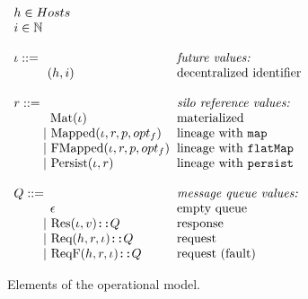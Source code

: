 \documentclass{article}
\theoremstyle{definition}
\newcommand{\gap}{\quad\quad}
\newcommand{\ba}{\begin{array}}
\newcommand{\ea}{\end{array}}
\begin{document}
\begin{figure}[ht!]
\centering

$\ba[t]{l@{\hspace{2mm}}l}
h \in Hosts                                         & \\   
i \in \mathbb{N}                                    & \\   
                                                    & \\   
\iota  ::=                                          & \mbox{{\it{future values:}}} \\
\gap \:\:\: (h, i)                                  & \mbox{decentralized identifier} \\   
                                                    & \\   
r ::=                                               & \mbox{{\it{silo reference values:}}} \\
\gap \:\:\:\: \text{Mat}(\iota)                     & \mbox{materialized} \\    
\gap ~|~  \text{Mapped}(\iota, r, p, opt_f)         & \mbox{lineage with \texttt{map}} \\    
\gap ~|~  \text{FMapped}(\iota, r, p, opt_f)        & \mbox{lineage with \texttt{flatMap}} \\   
\gap ~|~  \text{Persist}(\iota, r)                  & \mbox{lineage with \texttt{persist}} \\
                                                    & \\   
Q      ::=                                          & \mbox{{\it{message queue values:}}} \\
\gap \:\:\:\: \epsilon                              & \mbox{empty queue} \\
\gap ~|~    \text{Res}(\iota, v) \texttt{::} Q      & \mbox{response} \\
\gap ~|~    \text{Req}(h, r, \iota) \texttt{::} Q   & \mbox{request}  \\
\gap ~|~    \text{ReqF}(h, r, \iota) \texttt{::} Q  & \mbox{request (fault)} \\
\ea$

\caption{Elements of the operational model.}
\label{fig:elems-opsem}

\end{figure}
\end{document}
